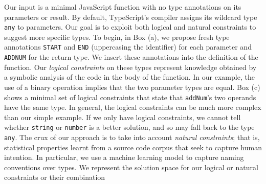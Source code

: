 \documentclass[sigplan,10pt,review,anonymous]{acmart} %
\newcommand{\margincomment}[2]{\marginpar{\scriptsize\color{Maroon}#1 says: #2}}
\newcommand{\adg}[1]{\margincomment{ADG}{#1}}
\theoremstyle{plain}
\theoremstyle{remark}
\theoremstyle{definition}
\begin{document}
\begin{figure*}
	\centering
	\def\svgwidth{0.75\linewidth}
	


	\vspace{1em}
	\begin{minipage}{\textwidth}
		Our input is a minimal JavaScript function
		with no type annotations on its parameters or result.
		By default, TypeScript's compiler assigns its wildcard type \lstinline+any+ to
		parameters.
		Our goal is to exploit both logical and natural constraints to suggest
		more specific types.
		To begin, in Box (a), we propose fresh type annotations  \textcolor{mygreen}{\texttt{START}} and \textcolor{mygreen}{\texttt{END}} (uppercasing the identifier) for each parameter and \textcolor{mygreen}{\texttt{ADDNUM}} for the return type.
		We insert these annotations into the definition of the function.
		Our \emph{logical constraints} on these types represent knowledge obtained
		by a symbolic analysis of the code in the body of the function.
		In our example, the use of a binary operation implies that the two parameter types are equal.
		Box (c) shows a minimal set of logical constraints that state
		that \lstinline+addNum+'s two operands have the same type.
		In general, the logical constraints can be much more complex than our simple example.
		If we only have logical constraints, we cannot tell
		whether \lstinline{string} or \lstinline{number} is a better solution,
		and so may fall back to the type \lstinline{any}.
		The crux of our approach is to take into account \emph{natural constraints};
		that is, statistical properties learnt from a source code corpus that seek to
		capture human intention.
		In particular, we use a machine learning model to capture naming conventions over types.
		We represent the solution space for our logical or natural constraints or their combination

\end{minipage}
\end{figure*}
\end{document}

